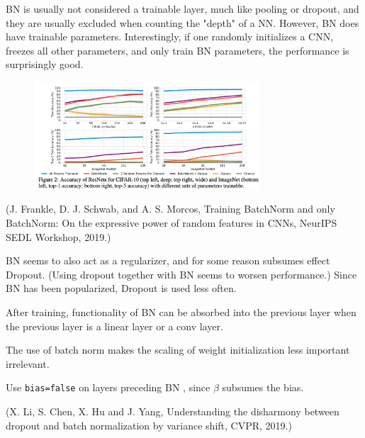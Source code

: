 \begin{concept}
    BN is usually not considered a trainable layer, much like pooling or dropout, and they are usually excluded when counting the "depth" of a NN. However, BN does have trainable parameters. Interestingly, if one randomly initializes a CNN, freezes all other parameters, and only train BN parameters, the performance is surprisingly good.

    \begin{figure}[H]
        \centering
        \includegraphics[width=0.75\textwidth]{.././assets/6.14.png}
    \end{figure}

    (J. Frankle, D. J. Schwab, and A. S. Morcos, Training BatchNorm and only BatchNorm: On the expressive power of random features in CNNs, NeurIPS SEDL Workshop, 2019.)
\end{concept}

\begin{concept}[6.51][Discussion of BN]
    BN seems to also act as a regularizer, and for some reason subsumes effect Dropout. (Using dropout together with BN seems to worsen performance.) Since BN has been popularized, Dropout is used less often.

    After training, functionality of BN can be absorbed into the previous layer when the previous layer is a linear layer or a conv layer.

    The use of batch norm makes the scaling of weight initialization less important irrelevant.

    Use \texttt{bias=false} on layers preceding BN , since $\beta$ subsumes the bias.

    (X. Li, S. Chen, X. Hu and J. Yang, Understanding the disharmony between dropout and batch normalization by variance shift, CVPR, 2019.)
\end{concept}
